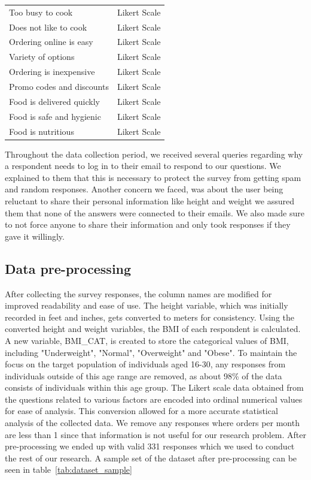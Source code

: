\documentclass[a4paper,fleqn]{cas-sc}
\begin{document}
\begin{table}[width=\linewidth,cols=2,pos=h]
\begin{tabular*}{\tblwidth}{@{\extracolsep{\fill}}LL@{}}
        Too busy to cook & Likert Scale\\
        Does not like to cook & Likert Scale\\
        Ordering online is easy & Likert Scale\\
        Variety of options & Likert Scale\\
        Ordering is inexpensive & Likert Scale\\
        Promo codes and discounts & Likert Scale \\
        Food is delivered quickly & Likert Scale \\
        Food is safe and hygienic & Likert Scale\\
        Food is nutritious & Likert Scale \\
        \hline
    \end{tabular*}
    \end{table}
    
Throughout the data collection period, we received several queries regarding why a respondent needs to log in to their email to respond to our questions. We explained to them that this is necessary to protect the survey from getting spam and random responses. Another concern we faced, was about the user being reluctant to share their personal information like height and weight we assured them that none of the answers were connected to their emails. We also made sure to not force anyone to share their information and only took responses if they gave it willingly. 

\subsection{Data pre-processing}
After collecting the survey responses, the column names are modified for improved readability and ease of use. The height variable, which was initially recorded in feet and inches, gets converted to meters for consistency. Using the converted height and weight variables, the BMI of each respondent is calculated. A new variable, BMI\_CAT, is created to store the categorical values of BMI, including "Underweight", "Normal", "Overweight" and "Obese". To maintain the focus on the target population of individuals aged 16-30, any responses from individuals outside of this age range are removed, as about 98\% of the data consists of individuals within this age group. The Likert scale data obtained from the questions related to various factors are encoded into ordinal numerical values for ease of analysis. This conversion allowed for a more accurate statistical analysis of the collected data. We remove any responses where orders per month are less than 1 since that information is not useful for our research problem. After pre-processing we ended up with valid 331 responses which we used to conduct the rest of our research. A sample set of the dataset after pre-processing can be seen in table~\ref{tab:dataset_sample}
\end{document}
